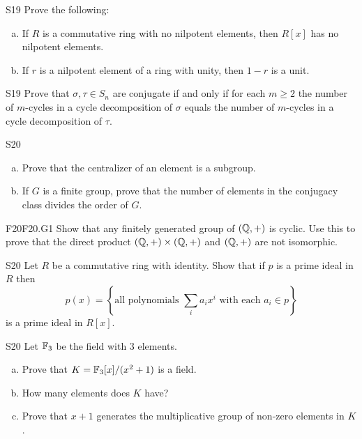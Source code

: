 \documentclass[../AlgebraQualSolutions.tex]{subfiles}
\begin{document}
	\begin{prob}{S19}{}
	Prove the following:
	\begin{enumerate}[(a)]
	\item If $R$ is a commutative ring with no nilpotent elements, then $R[x]$ has no nilpotent elements.
	\item If $r$ is a nilpotent element of a ring with unity, then $1 - r$ is a unit.
	\end{enumerate}
	\end{prob}
	

	
	\begin{prob}{S19}{}
	Prove that $\sigma,\tau \in S_n$ are conjugate if and only if for each $m \geq 2$ the number of $m$-cycles in a cycle decomposition of $\sigma$ equals the number of $m$-cycles in a cycle decomposition of $\tau$.
	\end{prob}
	
	\begin{prob}{S20}{}
	\begin{enumerate}[(a)]
	\item Prove that the centralizer of an element is a subgroup.
	\item If $G$ is a finite group, prove that the number of elements in the conjugacy class divides the order of $G$.
	\end{enumerate}
	\end{prob}
	
	\begin{prob}{F20}{F20.G1}
	Show that any finitely generated group of $(\mathbb{Q},+)$ is cyclic. Use this to prove that the direct product $(\mathbb{Q},+) \times (\mathbb{Q},+)$ and $(\mathbb{Q},+)$ are not isomorphic.
	\end{prob}

	\begin{prob}{S20}{}
	Let $R$ be a commutative ring with identity. Show that if $p$ is a prime ideal in $R$ then
		\[p(x) = \left\{\textrm{all polynomials } \sum_i a_ix^i \textrm{ with each } a_i \in p \right\} \]
	is a prime ideal in $R[x]$.
	\end{prob}
	
	\begin{prob}{S20}{}
	Let $\mathbb{F}_3$ be the field with 3 elements.
	\begin{enumerate}[(a)]
	\item Prove that $K = \mathbb{F}_3[x]/(x^2 + 1)$ is a field.
	\item How many elements does $K$ have?
	\item Prove that $x+1$ generates the multiplicative group of non-zero elements in $K$.
	\end{enumerate}
	\end{prob}
\end{document}
